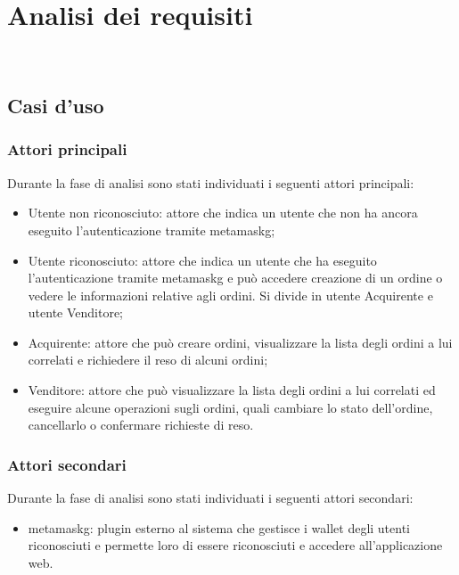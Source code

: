 
\chapter{Analisi dei requisiti}
\label{cap:analisi-requisiti}

\\

\section{Casi d'uso}

\subsection{Attori principali}
Durante la fase di analisi sono stati individuati i seguenti attori principali:
\begin{itemize}
    \item Utente non riconosciuto: attore che indica un utente che non ha ancora eseguito l'autenticazione tramite \gls{metamaskg};
    \item Utente riconosciuto: attore che indica un utente che ha eseguito l'autenticazione tramite \gls{metamaskg} e può accedere creazione di un ordine o vedere le informazioni relative agli ordini. Si divide in utente Acquirente e utente Venditore;
    \item Acquirente: attore che può creare ordini, visualizzare la lista degli ordini a lui correlati e richiedere il reso di alcuni ordini;
    \item Venditore: attore che può visualizzare la lista degli ordini a lui correlati ed eseguire alcune operazioni sugli ordini, quali cambiare lo stato dell'ordine, cancellarlo o confermare richieste di reso.
\end{itemize}

\subsection{Attori secondari}
Durante la fase di analisi sono stati individuati i seguenti attori secondari:
\begin{itemize}
    \item \gls{metamaskg}: plugin esterno al sistema che gestisce i wallet degli utenti riconosciuti e permette loro di essere riconosciuti e accedere all'applicazione web.
\end{itemize}

